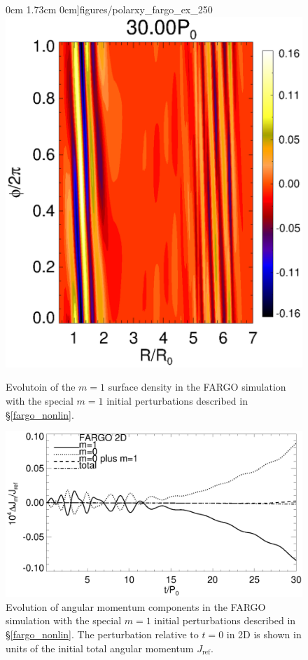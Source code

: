 \begin{figure}
  0cm 1.73cm 0cm]{figures/polarxy_fargo_ex_250}\includegraphics[scale=0.4,clip=true,trim=2.24cm
  0cm 0.0cm 0cm]{figures/polarxy_fargo_ex_300}
  \caption{Evolutoin of the $m=1$ surface density in the FARGO
    simulation with the special $m=1$ initial perturbations
    described in \S\ref{fargo_nonlin}.\label{2d_angmom_ex_evol}} 
\end{figure}  



\begin{figure}
  \includegraphics[width=\linewidth]{figures/nonaxi_evol_ang_fargo_ex}
  \caption{Evolution of angular momentum components in the 
    FARGO simulation with the special $m=1$ initial perturbations
    described in \S\ref{fargo_nonlin}. 
    The perturbation
    relative to $t=0$ in 2D is shown in units of the
    initial total angular momentum $J_\mathrm{ref}$.\label{2d_angmom_ex}} 
\end{figure}  